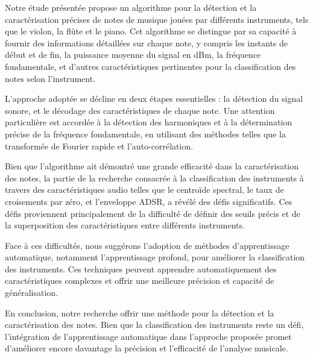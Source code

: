 

Notre étude présentée propose un algorithme pour la détection et la caractérisation précises de notes de musique jouées par différents instruments, tels que le violon, la flûte et le piano. Cet algorithme se distingue par sa capacité à fournir des informations détaillées sur chaque note, y compris les instants de début et de fin, la puissance moyenne du signal en dBm, la fréquence fondamentale, et d'autres caractéristiques pertinentes pour la classification des notes selon l'instrument.

L'approche adoptée se décline en deux étapes essentielles : la détection du signal sonore, et le décodage des caractéristiques de chaque note. Une attention particulière est accordée à la détection des harmoniques et à la détermination précise de la fréquence fondamentale, en utilisant des méthodes telles que la transformée de Fourier rapide et l'auto-corrélation.

Bien que l'algorithme ait démontré une grande efficacité dans la caractérisation des notes, la partie de la recherche consacrée à la classification des instruments à travers des caractéristiques audio telles que le centroïde spectral, le taux de croisements par zéro, et l'enveloppe ADSR, a révélé des défis significatifs. Ces défis proviennent principalement de la difficulté de définir des seuils précis et de la superposition des caractéristiques entre différents instruments.

Face à ces difficultés, nous suggérons l'adoption de méthodes d'apprentissage automatique, notamment l'apprentissage profond, pour améliorer la classification des instruments. Ces techniques peuvent apprendre automatiquement des caractéristiques complexes et offrir une meilleure précision et capacité de généralisation.

En conclusion, notre recherche offrir une méthode pour la détection et la caractérisation des notes. Bien que la classification des instruments reste un défi, l'intégration de l'apprentissage automatique dans l'approche proposée promet d'améliorer encore davantage la précision et l'efficacité de l'analyse musicale.
